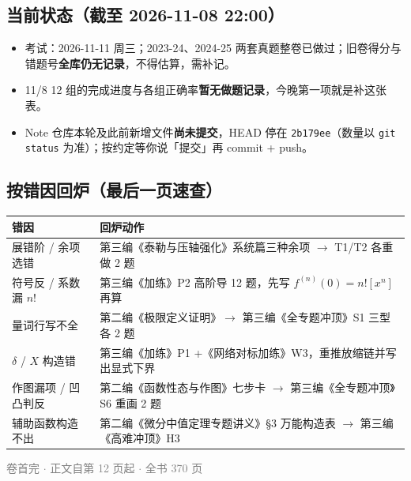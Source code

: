 \documentclass[11pt,a4paper]{ctexart}
\begin{document}
\subsection{当前状态（截至 2026-11-08 22:00）}
\begin{itemize}
\item 考试：2026-11-11 周三；2023-24、2024-25 两套真题整卷已做过；旧卷得分与错题号\textbf{全库仍无记录}，不得估算，需补记。
\item 11/8 12 组的完成进度与各组正确率\textbf{暂无做题记录}，今晚第一项就是补这张表。
\item Note 仓库本轮及此前新增文件\textbf{尚未提交}，HEAD 停在 \texttt{2b179ee}（数量以 \texttt{git status} 为准）；按约定等你说「提交」再 commit + push。
\end{itemize}

\subsection{按错因回炉（最后一页速查）}
\begin{longtable}{@{}p{4.4cm}p{10.6cm}@{}}
\toprule
\textbf{错因} & \textbf{回炉动作} \\
\midrule
展错阶 / 余项选错 & 第三编《泰勒与压轴强化》系统篇三种余项 $\to$ T1/T2 各重做 2 题 \\
符号反 / 系数漏 $n!$ & 第三编《加练》P2 高阶导 12 题，先写 $f^{(n)}(0)=n![x^n]$ 再算 \\
量词行写不全 & 第二编《极限定义证明》$\to$ 第三编《全专题冲顶》S1 三型各 2 题 \\
$\delta$ / $X$ 构造错 & 第三编《加练》P1 +《网络对标加练》W3，重推放缩链并写出显式下界 \\
作图漏项 / 凹凸判反 & 第二编《函数性态与作图》七步卡 $\to$ 第三编《全专题冲顶》S6 重画 2 题 \\
辅助函数构造不出 & 第二编《微分中值定理专题讲义》\S3 万能构造表 $\to$ 第三编《高难冲顶》H3 \\
\bottomrule
\end{longtable}

\vfill
\begin{center}
\textcolor{gray}{\footnotesize 卷首完 $\cdot$ 正文自第 12 页起 $\cdot$ 全书 370 页}
\end{center}
\end{document}

